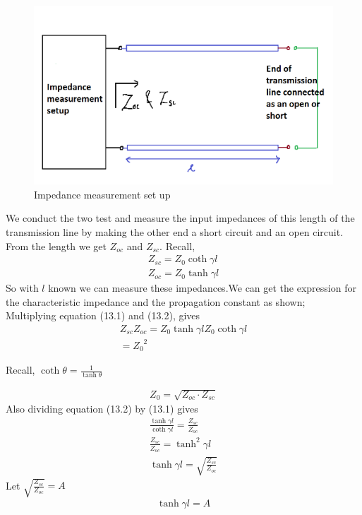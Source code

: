 \begin{figure}[h]
\centering
\includegraphics[width=1\linewidth]{"./graphics/Impedance"}
\caption{Impedance measurement set up}
\end{figure}
We conduct the two test and measure the input impedances of this length of the transmission line by making the other end a short circuit and an open circuit. From the length we get $Z
_{oc}$ and $Z_{sc}$. Recall,
\begin{align}
Z_{sc} = Z_0 \coth\gamma l\\
Z_{oc} = Z_0 \tanh\gamma l
\end{align}
So with $l$ known we can measure these impedances.We can get the expression for the characteristic impedance and the propagation constant as shown;\\
Multiplying equation (13.1) and (13.2), gives
\begin{align*}
Z_{sc}Z_{oc} = Z_0\tanh\gamma l Z_0\coth\gamma l\\ = {Z_0}^2
\end{align*}
\begin{center}
Recall, $\coth\theta = \frac{1}{\tanh\theta}$
\end{center}
\begin{align*}
Z_0 = \sqrt{Z_{oc}\cdot Z_{sc}}
\end{align*}
Also dividing equation (13.2) by (13.1) gives
\begin{align*}
\frac{\tanh\gamma l}{\coth\gamma l} = \frac{Z_{sc}}{Z_{oc}}\\
\frac{Z_{sc}}{Z_{oc}} = \tanh^2\gamma l\\
\tanh\gamma l = \sqrt{\frac{Z_{sc}}{Z_{oc}}}
\end{align*}
Let $\sqrt{\frac{Z_{sc}}{Z_{oc}}} = A$
\begin{align*}
\tanh\gamma l = A
\end{align*}
